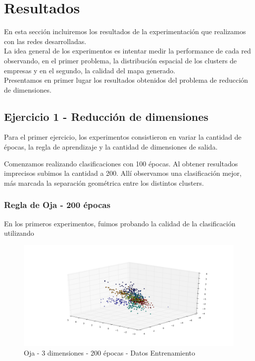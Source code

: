 \section{Resultados}
En esta sección incluiremos los resultados de la experimentación que realizamos con las redes desarrolladas.\\

La idea general de los experimentos es intentar medir la performance
de cada red observando, en el primer problema, la distribución espacial de los clusters de empresas y en el segundo, la calidad 
del mapa generado.\\

Presentamos en primer lugar los resultados obtenidos del problema de reducción de dimensiones.

\subsection{Ejercicio 1 - Reducción de dimensiones}

Para el primer ejercicio, los experimentos consistieron en variar la cantidad de épocas, la regla de aprendizaje y la cantidad de dimensiones de salida.

Comenzamos realizando clasificaciones con 100 épocas. Al obtener resultados imprecisos subimos la cantidad a 200. Allí observamos una clasificación mejor, más marcada la separación geométrica entre los distintos clusters.\\


\subsubsection{Regla de Oja - 200 épocas}
En los primeros experimentos, fuimos probando la calidad de la clasificación utilizando 

\begin{figure}[h]
  \begin{center}
    \includegraphics[scale=0.4]{../img/ej1/oja/alt-oja_3salida_200ep_train.png}
  \caption{Oja - 3 dimensiones - 200 épocas - Datos Entrenamiento}
  \end{center}
\end{figure}

